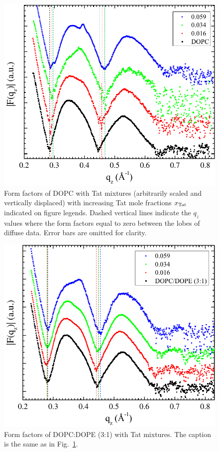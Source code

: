 \begin{figure}[htbp]
  \centering
  \includegraphics[width=\textwidth]{figures/Tat/NFIT_results/DOPC_form_factors}
  \caption{Form factors of DOPC with Tat mixtures (arbitrarily scaled and vertically 
  displaced) with increasing Tat mole fractions $x_\textrm{Tat}$ indicated on figure 
  legends. 
  Dashed vertical lines indicate the $q_z$ values where the form factors equal 
  to zero between the lobes of diffuse data.
  Error bars are omitted for clarity.}
  \label{fig:form_factor1}
\end{figure}

\begin{figure}[htbp]
  \centering
  \includegraphics[width=\textwidth]{figures/Tat/NFIT_results/DOPCDOPE3to1_form_factors}
  \caption{Form factors of DOPC:DOPE (3:1) with Tat mixtures.
  The caption is the same as in Fig.~\ref{fig:form_factor1}.}
  \label{fig:form_factor2}
\end{figure}

